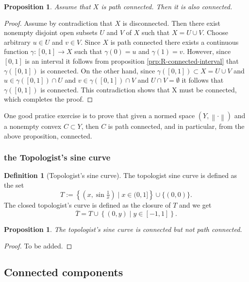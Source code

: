 \documentclass[11pt,a4paper]{article}
\theoremstyle{definition}
\newtheorem{definition}{Definition}[section]
\theoremstyle{plain}
\newtheorem{proposition}[theorem]{Proposition}
\newcommand{\set}[2]{ \left\{ #1 \mid #2 \right\} }
\newcommand{\norm}[1]{\left\lVert #1\right\rVert}
\begin{document}
  \begin{proposition}
    Assume that $X$ is path connected. Then it is also connected.
  \end{proposition}
  \begin{proof}
    Assume by contradiction that $X$ is disconnected.
    Then there exist nonempty disjoint open subsets $U$ and $V$ of $X$
    such that $X = U \cup V$.
    Choose arbitrary $u \in U$ and $v \in V$.
    Since $X$ is path connected there exists a continuous function
    $\gamma \colon [0,1] \to X$ such that $\gamma(0) = u$ and $\gamma(1) = v$.
    However, since $[0,1]$ is an interval it follows from proposition
    \ref{prp:R-connected-interval} that $\gamma([0,1])$ is connected.
    On the other hand, since $\gamma([0,1]) \subset X = U \cup V$
    and $u \in \gamma([0,1]) \cap U$ and $v \in \gamma([0,1]) \cap V$
    and $U \cap V = \emptyset$ it follows that $\gamma([0,1])$ is connected.
    This contradiction shows that X must be connected,
    which completes the proof.
  \end{proof}

  One good pratice exercise is to prove that given a normed space
  $(Y,\norm{\cdot})$ and a nonempty convex $C \subset Y$, then $C$
  is path connected, and in particular, from the above proposition, connected.

  \subsubsection{the Topologist's sine curve}

  \begin{definition}[Topologist's sine curve]
    The topologist sine curve is defined as the set
    \[
      T := \set{\left(x,\sin {\tfrac {1}{x}}\right)}{x\in (0,1]} \cup \{(0,0)\}.
    \]
    The closed topologist's curve is defined as the closure of $T$ and
    we get
    \[
      \overline T = T \cup \set{(0,y)}{y \in [-1,1]}.
    \]
  \end{definition}

  \begin{proposition}
    The topologist's sine curve is connected but not path connected.
  \end{proposition}
  \begin{proof}
    To be added.
  \end{proof}

  \subsection{Connected components}
\end{document}
